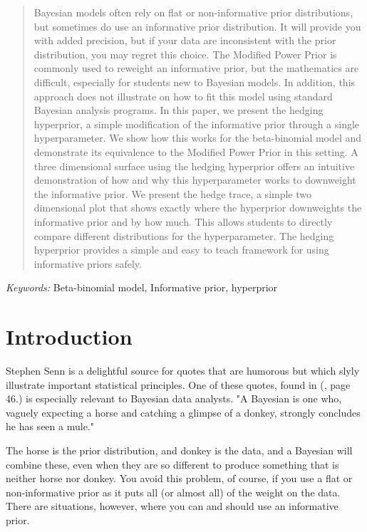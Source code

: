 \documentclass[12pt]{article}
\begin{document}
\bigskip
\begin{abstract}
Bayesian models often rely on flat or non-informative prior distributions, but sometimes do use an informative prior distribution. It will provide you with added precision, but if your data are inconsistent with the prior distribution, you may regret this choice. The Modified Power Prior is commonly used to reweight an informative prior, but the mathematics are difficult, especially for students new to Bayesian models. In addition, this approach does not illustrate on how to fit this model using standard Bayesian analysis programs. In this paper, we present the hedging hyperprior, a simple modification of the informative prior through a single hyperparameter. We show how this works for the beta-binomial model and demonstrate its equivalence to the Modified Power Prior in this setting. A three dimensional surface using the hedging hyperprior offers an intuitive demonstration of how and why this hyperparameter works to downweight the informative prior. We present the hedge trace, a simple two dimensional plot that shows exactly where the hyperprior downweights the informative prior and by how much. This allows students to directly compare different distributions for the hyperparameter. The hedging hyperprior provides a simple and easy to teach framework for using informative priors safely.


\end{abstract}

\noindent%
{\it Keywords:}  Beta-binomial model, Informative prior, hyperprior
\vfill

\newpage
{} %
\section{Introduction}
\label{sec:intro}

Stephen Senn is a delightful source for quotes that are humorous but which slyly illustrate important statistical principles. One of these quotes, found in (\cite{senn08}, page 46.) is especially relevant to Bayesian data analysts. "A Bayesian is one who, vaguely expecting a horse and catching a glimpse of a donkey, strongly concludes he has seen a mule." 

The horse is the prior distribution, and donkey is the data, and a Bayesian will combine these, even when they are so different to produce something that is neither horse nor donkey. You avoid this problem, of course, if you use a flat or non-informative prior as it puts all (or almost all) of the weight on the data. There are situations, however, where you can and should use an informative prior.
\end{document}

